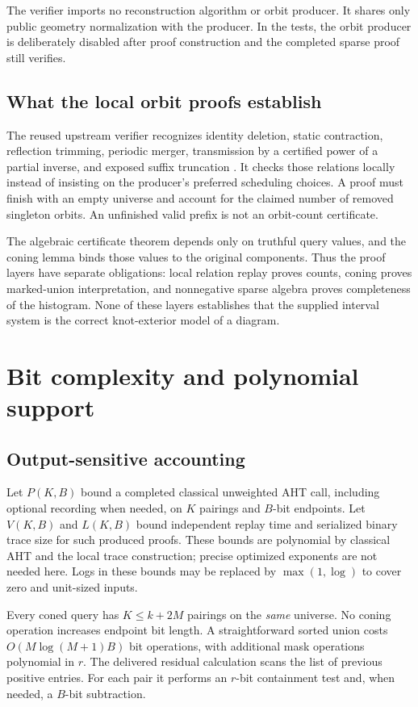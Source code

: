 \documentclass[11pt,letterpaper]{article}
\begin{document}
The verifier imports no reconstruction algorithm or orbit producer. It shares
only public geometry normalization with the producer. In the tests, the orbit
producer is deliberately disabled after proof construction and the completed
sparse proof still verifies.

\subsection{What the local orbit proofs establish}
The reused upstream verifier recognizes identity deletion, static contraction,
reflection trimming, periodic merger, transmission by a certified power of a
partial inverse, and exposed suffix truncation \cite{orbitreport}. It checks
those relations locally instead of insisting on the producer's preferred
scheduling choices. A proof must finish with an empty universe and account
for the claimed number of removed singleton orbits. An unfinished valid prefix
is not an orbit-count certificate.

The algebraic certificate theorem depends only on truthful query values, and
the coning lemma binds those values to the original components. Thus the proof
layers have separate obligations: local relation replay proves counts,
coning proves marked-union interpretation, and nonnegative sparse algebra proves
completeness of the histogram. None of these layers establishes that the
supplied interval system is the correct knot-exterior model of a diagram.

\section{Bit complexity and polynomial support}
\label{sec:complexity}

\subsection{Output-sensitive accounting}
Let $P(K,B)$ bound a completed classical unweighted AHT call, including optional
recording when needed, on $K$ pairings and $B$-bit endpoints. Let $V(K,B)$ and
$L(K,B)$ bound independent replay time and serialized binary trace size for
such produced proofs. These bounds are polynomial by classical AHT and the
local trace construction; precise optimized exponents are not needed here.
Logs in these bounds may be replaced by $\max(1,\log)$ to cover zero and
unit-sized inputs.

Every coned query has $K\leq k+2M$ pairings on the \emph{same} universe.
No coning operation increases endpoint bit length. A straightforward sorted
union costs $O(M\log(M+1)B)$ bit operations, with additional mask operations
polynomial in $r$. The delivered residual calculation scans the list of
previous positive entries. For each pair it performs an $r$-bit containment
test and, when needed, a $B$-bit subtraction.
\end{document}
